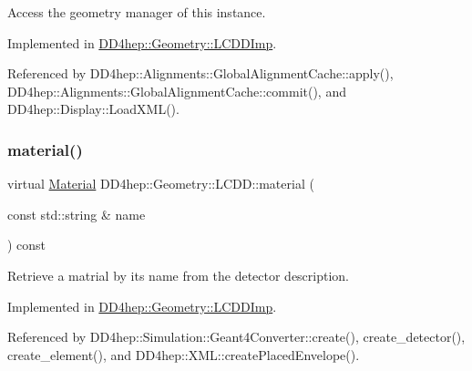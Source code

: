 Access the geometry manager of this instance. 



Implemented in \hyperlink{class_d_d4hep_1_1_geometry_1_1_l_c_d_d_imp_af8feecb8dfc2acc870c2882d5a0463a4}{D\+D4hep\+::\+Geometry\+::\+L\+C\+D\+D\+Imp}.



Referenced by D\+D4hep\+::\+Alignments\+::\+Global\+Alignment\+Cache\+::apply(), D\+D4hep\+::\+Alignments\+::\+Global\+Alignment\+Cache\+::commit(), and D\+D4hep\+::\+Display\+::\+Load\+X\+M\+L().

\hypertarget{class_d_d4hep_1_1_geometry_1_1_l_c_d_d_aec8adc99bc62ade78afd0a444a76fd04}{}\label{class_d_d4hep_1_1_geometry_1_1_l_c_d_d_aec8adc99bc62ade78afd0a444a76fd04} 
\subsubsection{\texorpdfstring{material()}{material()}}
{\footnotesize\ttfamily virtual \hyperlink{class_d_d4hep_1_1_geometry_1_1_material}{Material} D\+D4hep\+::\+Geometry\+::\+L\+C\+D\+D\+::material (\begin{DoxyParamCaption}\item[{const std\+::string \&}]{name }\end{DoxyParamCaption}) const\hspace{0.3cm}{\ttfamily [pure virtual]}}



Retrieve a matrial by it\textquotesingle{}s name from the detector description. 



Implemented in \hyperlink{class_d_d4hep_1_1_geometry_1_1_l_c_d_d_imp_a06b992f774fb1bfbd41ba41daab42ef4}{D\+D4hep\+::\+Geometry\+::\+L\+C\+D\+D\+Imp}.



Referenced by D\+D4hep\+::\+Simulation\+::\+Geant4\+Converter\+::create(), create\+\_\+detector(), create\+\_\+element(), and D\+D4hep\+::\+X\+M\+L\+::create\+Placed\+Envelope().

\hypertarget{class_d_d4hep_1_1_geometry_1_1_l_c_d_d_ad239fb24b7d6eb41abf697f2710ad6a3}{}\label{class_d_d4hep_1_1_geometry_1_1_l_c_d_d_ad239fb24b7d6eb41abf697f2710ad6a3} 
